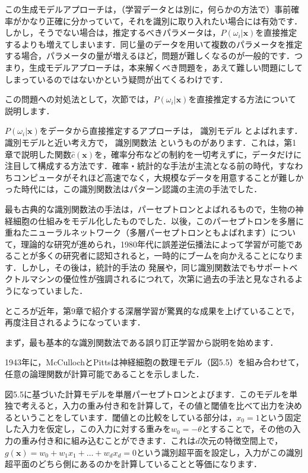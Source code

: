 この生成モデルアプローチは，（学習データとは別に，何らかの方法で）事前確率がかなり正確に分かっていて，それを識別に取り入れたい場合には有効です．しかし，そうでない場合は，推定するべきパラメータは，$P(\omega_i|\bm{x})$を直接推定するよりも増えてしまいます．同じ量のデータを用いて複数のパラメータを推定する場合，パラメータの量が増えるほど，問題が難しくなるのが一般的です．つまり，生成モデルアプローチは，本来解くべき問題を，あえて難しい問題にしてしまっているのではないかという疑問が出てくるわけです．

この問題への対処法として，次節では，$P(\omega_i|\bm{x})$を直接推定する方法について説明します．


$P(\omega_i|\bm{x})$をデータから直接推定するアプローチは，
識別モデル
とよばれます．
識別モデルと近い考え方で，
識別関数法
というものがあります．これは，第1章で説明した関数$\hat{c}(\bm{x})$を，確率分布などの制約を一切考えずに，データだけに注目して構成する方法です．確率・統計的な手法が主流となる前の時代，すなわちコンピュータがそれほど高速でなく，大規模なデータを用意することが難しかった時代には，この識別関数法はパターン認識の主流の手法でした．

最も古典的な識別関数法の手法は，パーセプトロンとよばれるもので，生物の神経細胞の仕組みをモデル化したものでした．以後，このパーセプトロンを多層に重ねたニューラルネットワーク（多層パーセプトロンともよばれます）について，理論的な研究が進められ，1980年代に誤差逆伝播法によって学習が可能であることが多くの研究者に認知されると，一時的にブームを向かえることになります．しかし，その後は，統計的手法の
発展や，同じ識別関数法でもサポートベクトルマシンの優位性が強調されるにつれて，次第に過去の手法と見なされるようになっていました．

ところが近年，第9章で紹介する深層学習が驚異的な成果を上げていることで，再度注目されるようになっています．


まず，最も基本的な識別関数法である誤り訂正学習から説明を始めます．

1943年に，McCullochとPittsは神経細胞の数理モデル（図5.5）を組み合わせて，任意の論理関数が計算可能であることを示しました．

図5.5に基づいた計算モデルを単層パーセプトロンとよびます．このモデルを単独で考えると，入力の重み付き和を計算して，その値と閾値を比べて出力を決めるということをしています．閾値との比較をしている部分は，$x_0 = 1$という固定した入力を仮定し，この入力に対する重みを$w_0 = - \theta$とすることで，その他の入力の重み付き和に組み込むことができます．これは$d$次元の特徴空間上で，$g(\bm{x}) = w_0+w_1 x_1+\dots+w_d x_d = 0$という識別超平面を設定し，入力がこの識別超平面のどちら側にあるのかを計算していることと等価になります．

